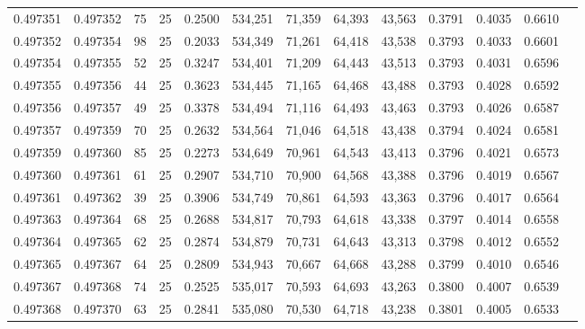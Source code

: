 \begin{tabular}{rrrrrrrrrrrrr}
0.497351 & 0.497352 &    75 &  25 &                                     0.2500 & 534,251 &  71,359 &  64,393 &  43,563 & 0.3791 & 0.4035 & 0.6610 \\
0.497352 & 0.497354 &    98 &  25 &                                     0.2033 & 534,349 &  71,261 &  64,418 &  43,538 & 0.3793 & 0.4033 & 0.6601 \\
0.497354 & 0.497355 &    52 &  25 &                                     0.3247 & 534,401 &  71,209 &  64,443 &  43,513 & 0.3793 & 0.4031 & 0.6596 \\
0.497355 & 0.497356 &    44 &  25 &                                     0.3623 & 534,445 &  71,165 &  64,468 &  43,488 & 0.3793 & 0.4028 & 0.6592 \\
0.497356 & 0.497357 &    49 &  25 &                                     0.3378 & 534,494 &  71,116 &  64,493 &  43,463 & 0.3793 & 0.4026 & 0.6587 \\
0.497357 & 0.497359 &    70 &  25 &                                     0.2632 & 534,564 &  71,046 &  64,518 &  43,438 & 0.3794 & 0.4024 & 0.6581 \\
0.497359 & 0.497360 &    85 &  25 &                                     0.2273 & 534,649 &  70,961 &  64,543 &  43,413 & 0.3796 & 0.4021 & 0.6573 \\
0.497360 & 0.497361 &    61 &  25 &                                     0.2907 & 534,710 &  70,900 &  64,568 &  43,388 & 0.3796 & 0.4019 & 0.6567 \\
0.497361 & 0.497362 &    39 &  25 &                                     0.3906 & 534,749 &  70,861 &  64,593 &  43,363 & 0.3796 & 0.4017 & 0.6564 \\
0.497363 & 0.497364 &    68 &  25 &                                     0.2688 & 534,817 &  70,793 &  64,618 &  43,338 & 0.3797 & 0.4014 & 0.6558 \\
0.497364 & 0.497365 &    62 &  25 &                                     0.2874 & 534,879 &  70,731 &  64,643 &  43,313 & 0.3798 & 0.4012 & 0.6552 \\
0.497365 & 0.497367 &    64 &  25 &                                     0.2809 & 534,943 &  70,667 &  64,668 &  43,288 & 0.3799 & 0.4010 & 0.6546 \\
0.497367 & 0.497368 &    74 &  25 &                                     0.2525 & 535,017 &  70,593 &  64,693 &  43,263 & 0.3800 & 0.4007 & 0.6539 \\
0.497368 & 0.497370 &    63 &  25 &                                     0.2841 & 535,080 &  70,530 &  64,718 &  43,238 & 0.3801 & 0.4005 & 0.6533 \\

\end{tabular}
